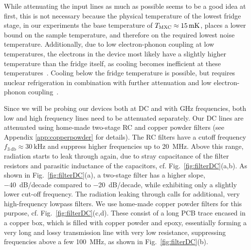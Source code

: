 While attenuating the input lines as much as possible seems to be a good idea at first, this is not necessary because the physical temperature of the lowest fridge stage, in our experiments the base temperature of $T_{\rm MXC}\approx\SI{15}{\milli\kelvin}$, places a lower bound on the sample temperature, and therefore on the required lowest noise temperature.
%
Additionally, due to low electron-phonon coupling at low temperatures, the electrons in the device most likely have a slightly higher temperature than the fridge itself, as cooling becomes inefficient at these temperatures~\cite{giazottoOpportunitiesMesoscopicsThermometry2006}.
%
Cooling below the fridge temperature is possible, but requires nuclear refrigeration in combination with further attenuation and low electron-phonon coupling~\cite{sarsby500MicrokelvinNanoelectronics2020,jonesProgressCoolingNanoelectronic2020}.
%

Since we will be probing our devices both at DC and with \si{\giga\hertz} frequencies, both low and high frequency lines need to be attenuated separately.
%
Our DC lines are attenuated using home-made two-stage RC and copper powder filters (see Appendix \ref{app:copperpowder} for details).
%
The RC filters have a cutoff frequency $f_{\SI{3}{\decibel}}\approx\SI{30}{\kilo\hertz}$ and suppress higher frequencies up to \SI{20}{\mega\hertz}.
%
Above this range, radiation starts to leak through again, due to stray capacitance of the filter resistors and parasitic inductance of the capacitors, cf. Fig.~\ref{fig:filterDC}(a,b).
%
As shown in Fig.~\ref{fig:filterDC}(a), a two-stage filter has a higher slope, \SI{-40}{dB/decade} compared to \SI{-20}{dB/decade}, while exhibiting only a slightly lower cut-off frequency.
%
The radiation leaking through calls for additional, very high-frequency lowpass filters.
%
We use home-made copper powder filters for this purpose, cf. Fig.~\ref{fig:filterDC}(c,d).
%
These consist of a long PCB trace encased in a copper box, which is filled with copper powder and epoxy, essentially forming a very long and lossy transmission line with very low resistance, suppressing frequencies above a few \SI{100}{\mega\hertz}, as shown in Fig.~\ref{fig:filterDC}(b).

